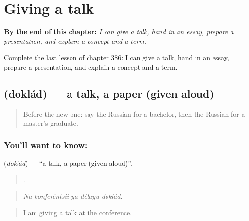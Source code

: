 
\chapter{Giving a talk}
\label{ch:ru-giving-a-talk}

\begin{chapteropening}
\textbf{By the end of this chapter:} \emph{I can give a talk, hand in an essay, prepare a presentation, and explain a concept and a term.}

Complete the last lesson of chapter 386: I can give a talk, hand in an essay, prepare a presentation, and explain a concept and a term.
\end{chapteropening}

\section[\texorpdfstring{\ru{доклад} (doklád)}{доклад (doklád)}]{ (doklád) — a talk, a paper (given aloud)}

\label{lesson:RU-C386-doklad}



\begin{quote}
Before the new one: say the Russian for a bachelor, then the Russian for a master’s graduate.
\end{quote}

\subsection*{You'll want to know: }
\textbf{} (\emph{doklád}) — \textquotedblleft{}a talk, a paper (given aloud)\textquotedblright{}.

\begin{quote}
    .
\end{quote}

\begin{quote}
\emph{Na konferéntsii ya délayu doklád.}
\end{quote}

\begin{quote}
I am giving a talk at the conference.
\end{quote}

